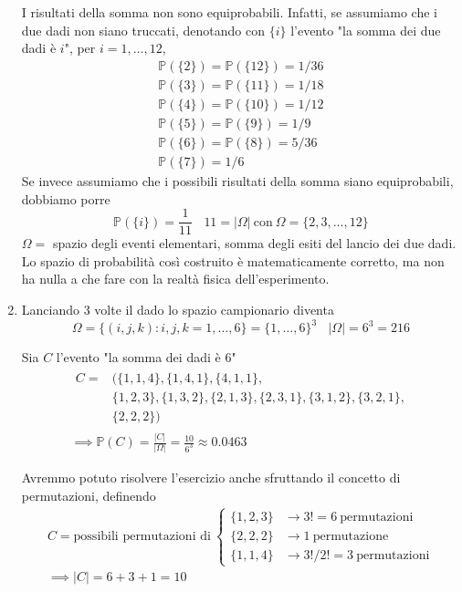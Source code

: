 \begin{enumerate}
\begin{oss}
I risultati della somma non sono equiprobabili. Infatti, se assumiamo che i due dadi non siano truccati, denotando con $\{i\}$ l'evento "la somma dei due dadi è $i$", per $i=1,\dots ,12$,\begin{equation*}
\begin{array}{ l }
\mathbb{P}(\{2\}) =\mathbb{P}(\{12\}) =1/36\\
\mathbb{P}(\{3\}) =\mathbb{P}(\{11\}) =1/18\\
\mathbb{P}(\{4\}) =\mathbb{P}(\{10\}) =1/12\\
\mathbb{P}(\{5\}) =\mathbb{P}(\{9\}) =1/9\\
\mathbb{P}(\{6\}) =\mathbb{P}(\{8\}) =5/36\\
\mathbb{P}(\{7\}) =1/6
\end{array}
\end{equation*}Se invece assumiamo che i possibili risultati della somma siano equiprobabili, dobbiamo porre\begin{equation*}
\mathbb{P}(\{i\}) =\frac{1}{11} \ \ \ \ 11=| \Omega | \ \text{con} \ \Omega =\{2,3,\dots ,12\}
\end{equation*}$\Omega =$ spazio degli eventi elementari, somma degli esiti del lancio dei due dadi. Lo spazio di probabilità così costruito è matematicamente corretto, ma non ha nulla a che fare con la realtà fisica dell'esperimento.
\end{oss}
\item Lanciando $3$ volte il dado lo spazio campionario diventa\begin{equation*}
\Omega =\{( i,j,k) :i,j,k=1,\dots ,6\} =\{1,\dots ,6\}^{3} \ \ \ \ | \Omega | =6^{3} =216
\end{equation*}

Sia $C$ l'evento "la somma dei dadi è $6$"\begin{gather*}
\begin{aligned}
C= & (\{1,1,4\} ,\{1,4,1\} ,\{4,1,1\} ,\\
 & \{1,2,3\} ,\{1,3,2\} ,\{2,1,3\} ,\{2,3,1\} ,\{3,1,2\} ,\{3,2,1\} ,\\
 & \{2,2,2\})
\end{aligned}\\
\implies \mathbb{P}( C) =\frac{| C| }{| \Omega | } =\frac{10}{6^{3}} \approx 0.0463
\end{gather*}

\begin{oss}
Avremmo potuto risolvere l'esercizio anche sfruttando il concetto di permutazioni, definendo\begin{gather*}
C=\text{possibili permutazioni di} \ \begin{cases}
\{1,2,3\} & \rightarrow 3!=6\ \text{permutazioni}\\
\{2,2,2\} & \rightarrow 1\ \text{permutazione}\\
\{1,1,4\} & \rightarrow 3!/2!=3\ \text{permutazioni}
\end{cases}\\
\implies | C| =6+3+1=10
\end{gather*}
\end{oss}
\end{enumerate}
\Soluzione

